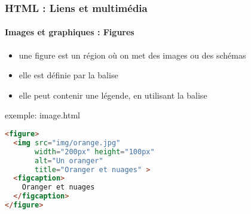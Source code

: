 \documentclass[xcolor=table]{beamer}
\begin{document}
\begin{frame}[fragile]
\frametitle{HTML : Liens et multimédia}
\framesubtitle{Images et graphiques : Figures}

\begin{minipage}{0.47\textwidth} 
	\begin{itemize}
		\item une figure est un région où on met des images ou des schémas 
		\item elle est définie par la balise 
		\item elle peut contenir une légende, en utilisant la balise 
	\end{itemize}
\end{minipage}
%
\begin{minipage}{0.52\textwidth}
\begin{exampleblock}{exemple: image.html}
\lstset{escapeinside=**}
\scriptsize\bfseries\vspace{-6pt}
\begin{lstlisting}[language={html}]
<figure>
  <img src="img/orange.jpg"
       width="200px" height="100px"
       alt="Un oranger" 
       title="Oranger et nuages" >
  <figcaption>
    Oranger et nuages
  </figcaption>
</figure>
\end{lstlisting}\vspace{-6pt}
\end{exampleblock}
\end{minipage}

\end{frame}
\end{document}

